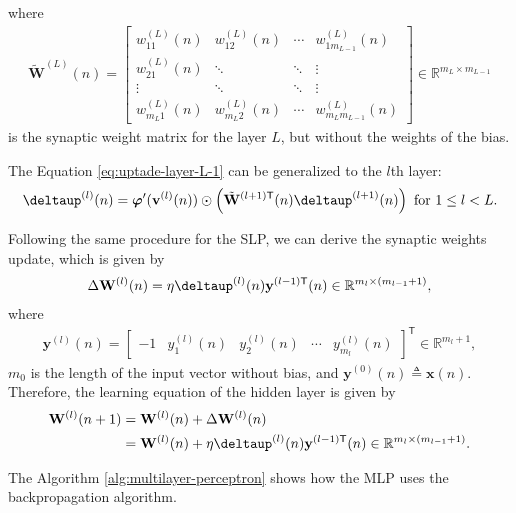 \documentclass[12pt,a4paper]{article}
\newcommand{\trans}{\mathsf{T}}
\newcommand{\Real}{\mathbb{R}}
\begin{document}
where
\begin{align}
    \tilde{\mathbf{W}}^{(L)}(n) = \begin{bmatrix}
        w_{11}^{(L)} (n) & w_{12}^{(L)} (n) & \cdots & w_{1 m_{L-1}}^{(L)} (n) \\
        w_{21}^{(L)} (n) & \ddots & \ddots & \vdots \\
        \vdots & \ddots & \ddots & \vdots \\
        w_{m_L1}^{(L)} (n) & w_{m_L2}^{(L)} (n) & \cdots & w_{m_Lm_{L-1}}^{(L)} (n)
    \end{bmatrix} \in \Real^{m_L \times m_{L-1}}
\end{align}
is the synaptic weight matrix for the layer \(L\), but without the weights of the bias.

The Equation \eqref{eq:uptade-layer-L-1} can be generalized to the \(l\)th layer:
\begin{align}
    \boldsymbol{\deltaup}^{(l)} (n) = \boldsymbol{\varphi}'(\mathbf{v}^{(l)}(n)) \odot \left( \tilde{\mathbf{W}}^{(l+1)\trans}(n) \boldsymbol{\deltaup}^{(l+1)} (n) \right)\text{ for } 1\leq l < L.
    \label{eq:uptade-layer-l}
\end{align}

Following the same procedure for the SLP, we can derive the synaptic weights update, which is given by
\begin{align}
    \Delta \mathbf{W}^{(l)}(n) = \eta\boldsymbol{\deltaup}^{(l)}(n) \mathbf{y}^{(l-1)\trans}(n) \in \Real^{m_l \times (m_{l-1}+1)},
\end{align}
where
\begin{align}
    \mathbf{y}^{(l)}(n) = \begin{bmatrix}
        -1 & y_1^{(l)}(n) & y_2^{(l)}(n) & \cdots & y_{m_{l}}^{(l)}(n)
    \end{bmatrix}^\trans \in \Real^{m_{l}+1},
\end{align}
\(m_0\) is the length of the input vector without bias, and \(\mathbf{y}^{(0)}(n) \triangleq \mathbf{x}(n)\). Therefore, the learning equation of the hidden layer is given by
\begin{align}
    \mathbf{W}^{(l)}(n+1) & = \mathbf{W}^{(l)}(n) + \Delta \mathbf{W}^{(l)}(n) \nonumber \\
    & = \mathbf{W}^{(l)}(n) + \eta\boldsymbol{\deltaup}^{(l)}(n) \mathbf{y}^{(l-1)\trans}(n) \in \Real^{m_l \times (m_{l-1}+1)}.
\end{align}


The Algorithm \ref{alg:multilayer-perceptron} shows how the MLP uses the backpropagation algorithm.
\end{document}
